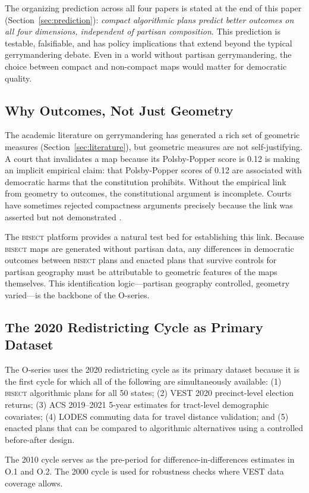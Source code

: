 The organizing prediction across all four papers is stated at the end of this paper
(Section~\ref{sec:prediction}): \textit{compact algorithmic plans predict better outcomes
on all four dimensions, independent of partisan composition}. This prediction is testable,
falsifiable, and has policy implications that extend beyond the typical gerrymandering debate.
Even in a world without partisan gerrymandering, the choice between compact and non-compact
maps would matter for democratic quality.

\subsection{Why Outcomes, Not Just Geometry}

The academic literature on gerrymandering has generated a rich set of geometric measures
(Section~\ref{sec:literature}), but geometric measures are not self-justifying. A court
that invalidates a map because its Polsby-Popper score is 0.12 is making an implicit
empirical claim: that Polsby-Popper scores of 0.12 are associated with democratic harms
that the constitution prohibits. Without the empirical link from geometry to outcomes,
the constitutional argument is incomplete. Courts have sometimes rejected compactness
arguments precisely because the link was asserted but not demonstrated \citep{veith2004}.

The \textsc{bisect} platform provides a natural test bed for establishing this link.
Because \textsc{bisect} maps are generated without partisan data, any differences in
democratic outcomes between \textsc{bisect} plans and enacted plans that survive
controls for partisan geography must be attributable to geometric features of the maps
themselves. This identification logic---partisan geography controlled, geometry varied---is
the backbone of the O-series.

\subsection{The 2020 Redistricting Cycle as Primary Dataset}

The O-series uses the 2020 redistricting cycle as its primary dataset because it is
the first cycle for which all of the following are simultaneously available:
(1) \textsc{bisect} algorithmic plans for all 50 states; (2) VEST 2020 precinct-level
election returns; (3) ACS 2019--2021 5-year estimates for tract-level demographic covariates;
(4) LODES commuting data for travel distance validation; and (5) enacted plans that can
be compared to algorithmic alternatives using a controlled before-after design.

The 2010 cycle serves as the pre-period for difference-in-differences estimates in O.1 and O.2.
The 2000 cycle is used for robustness checks where VEST data coverage allows.

